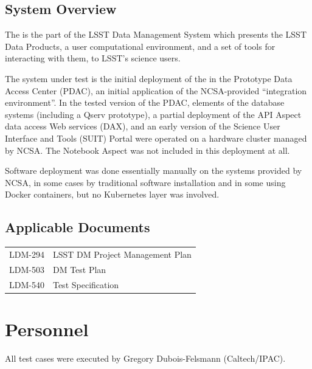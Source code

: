 \documentclass[DM,lsstdraft,STR,toc]{lsstdoc}
\begin{document}
\subsection{System Overview}
\label{sect:systemoverview}

The \product{} is the part of the LSST Data Management System which presents the LSST Data Products,
a user computational environment, and a set of tools for interacting with them, 
to LSST's science users.

The system under test is the initial deployment of the \product{} in the Prototype Data Access Center (PDAC),
an initial application of the NCSA-provided ``integration environment''.
In the tested version of the PDAC, 
elements of the database systems (including a Qserv prototype),
a partial deployment of the API Aspect data access Web services (DAX),
and an early version of the Science User Interface and Tools (SUIT) Portal were operated on a hardware cluster managed by NCSA.
The Notebook Aspect was not included in this deployment at all.

Software deployment was done essentially manually on the systems provided by NCSA,
in some cases by traditional software installation and in some using Docker containers,
but no Kubernetes layer was involved.

\subsection{Applicable Documents}
\label{sect:appdocs}

\begin{tabular}[htb]{l l}
LDM-294 & LSST DM Project Management Plan\\
LDM-503 & DM Test Plan\\
LDM-540 & \product{} Test Specification\\
\end{tabular}


\section{Personnel}
\label{sect:personnel}

All test cases were executed by Gregory Dubois-Felsmann (Caltech/IPAC).
\end{document}

